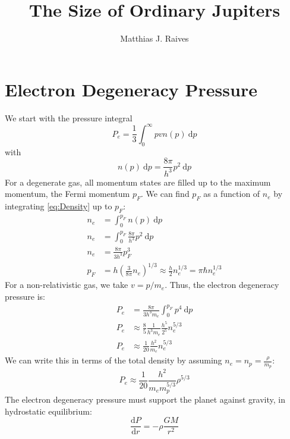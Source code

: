 \documentclass{article}
\title{The Size of Ordinary Jupiters}
\author{Matthias J. Raives}
\begin{document}
  
  \maketitle{}
  
  \section{Electron Degeneracy Pressure}
    We start with the pressure integral
    \begin{equation}
      P_{e} = \frac{1}{3}\int_{0}^{\infty}pvn(p)\:\mathrm{d}p\label{eq:Pressure}
    \end{equation}
    with
    \begin{equation}
      n(p)\:\mathrm{d}p = \frac{8\pi}{h^{3}}p^{2}\:\mathrm{d}p\label{eq:Density}
    \end{equation}
    For a degenerate gas, all momentum states are filled up to the maximum momentum, the Fermi momentum $p_{F}$.  We can find $p_{F}$ as a function of $n_{e}$ by integrating \ref{eq:Density} up to $p_{F}$:
    \begin{align}
      n_{e} &= \int_{0}^{p_{F}}n(p)\:\mathrm{d}p\\
      n_{e} &= \int_{0}^{p_{F}}\frac{8\pi}{h^{3}}p^{2}\:\mathrm{d}p\\
      n_{e} &= \frac{8\pi}{3h^{3}}p_{F}^{3}\\
      p_{F} &= h\left(\frac{3}{8\pi}n_{e}\right)^{1/3}\approx \frac{h}{2}n_{e}^{1/3} = \pi\hbar n_{e}^{1/3}
    \end{align}
    For a non-relativistic gas, we take $v=p/m_{e}$.  Thus, the electron degeneracy pressure is:
    \begin{align}
      P_{e} &= \frac{8\pi}{3h^{3}m_{e}}\int_{0}^{p_{F}}p^{4}\:\mathrm{d}p\\
      P_{e} &\approx \frac{8}{5}\frac{1}{h^{3}m_{e}}\frac{h^{5}}{2^{5}}n_{e}^{5/3}\\
      P_{e} &\approx \frac{1}{20}\frac{h^{2}}{m_{e}}n_{e}^{5/3}
    \end{align}
    We can write this in terms of the total density by assuming $n_{e}=n_{p}=\frac{\rho}{m_{p}}$:
    \begin{equation}
      P_{e} \approx \frac{1}{20}\frac{h^{2}}{m_{e}m_{p}^{5/3}}\rho^{5/3}
    \end{equation}
    The electron degeneracy pressure must support the planet against gravity, in hydrostatic equilibrium:
    \begin{equation}
      \frac{\mathrm{d}P}{\mathrm{d}r} = -\rho\frac{GM}{r^{2}}
    \end{equation}
\end{document}
